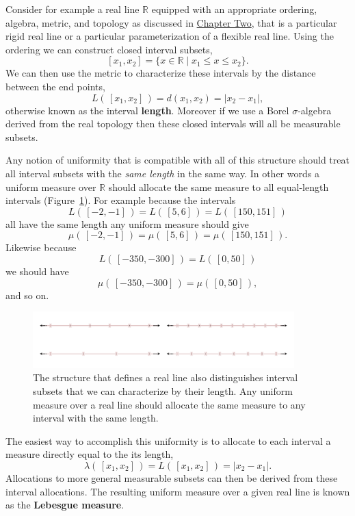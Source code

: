 \documentclass[
  letterpaper,
  DIV=11,
  numbers=noendperiod]{scrartcl}
\begin{document}
Consider for example a real line \(\mathbb{R}\) equipped with an
appropriate ordering, algebra, metric, and topology as discussed in
\href{https://betanalpha.github.io/assets/chapters_html/spaces.html}{Chapter
Two}, that is a particular rigid real line or a particular
parameterization of a flexible real line. Using the ordering we can
construct closed interval subsets, \[
[ x_{1}, x_{2} ] = \{ x \in \mathbb{R} \mid x_{1} \le x \le x_{2} \}.
\] We can then use the metric to characterize these intervals by the
distance between the end points, \[
L( \, [ x_{1}, x_{2} ] \, ) = d( x_{1}, x_{2} ) = | x_{2} - x_{1} |,
\] otherwise known as the interval \textbf{length}. Moreover if we use a
Borel \(\sigma\)-algebra derived from the real topology then these
closed intervals will all be measurable subsets.

Any notion of uniformity that is compatible with all of this structure
should treat all interval subsets with the \emph{same length} in the
same way. In other words a uniform measure over \(\mathbb{R}\) should
allocate the same measure to all equal-length intervals
(Figure~\ref{fig-equal-length-intervals}). For example because the
intervals \[
L( \, [-2, -1] \, ) = L( \, [5, 6] \, ) = L( \, [150, 151] \,)
\] all have the same length any uniform measure should give \[
\mu( \, [-2, -1] \, ) = \mu( \, [5, 6] \, ) = \mu( \, [150, 151] \, ).
\] Likewise because \[
L( \, [-350, -300] \, ) = L( \, [0, 50] \, )
\] we should have \[
\mu( \, [-350, -300] \, ) = \mu( \, [0, 50] \,),
\] and so on.

\begin{figure}

{\centering \includegraphics[width=0.9\textwidth,height=\textheight]{figures/interval_partitions/interval_partitions.pdf}

}

\caption{\label{fig-equal-length-intervals}The structure that defines a
real line also distinguishes interval subsets that we can characterize
by their length. Any uniform measure over a real line should allocate
the same measure to any interval with the same length.}

\end{figure}

The easiest way to accomplish this uniformity is to allocate to each
interval a measure directly equal to the its length, \[
\lambda( \, [x_{1}, x_{2}] \, )
= L( \, [x_{1}, x_{2}] \, )
= | x_{2} - x_{1} |.
\] Allocations to more general measurable subsets can then be derived
from these interval allocations. The resulting uniform measure over a
given real line is known as the \textbf{Lebesgue measure}.
\end{document}
